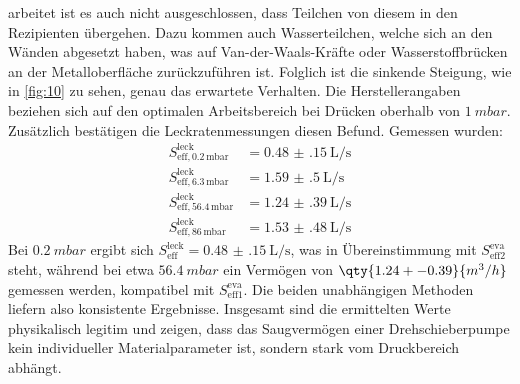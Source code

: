 arbeitet ist es auch nicht ausgeschlossen, dass Teilchen von diesem in den 
Rezipienten übergehen. Dazu kommen auch Wasserteilchen, welche sich an den 
Wänden abgesetzt haben, was auf Van-der-Waals-Kräfte oder Wasserstoffbrücken 
an der Metalloberfläche zurückzuführen ist. Folglich ist die sinkende Steigung, 
wie in \autoref{fig:10} zu sehen, genau das erwartete Verhalten. Die Herstellerangaben
beziehen sich auf den optimalen Arbeitsbereich bei Drücken oberhalb von $\qty{1}{mbar}$.
\vspace{0.5em}
\\
Zusätzlich bestätigen die Leckratenmessungen diesen Befund. Gemessen wurden:
\begin{align*}
    S_{\text{eff}, 0.2\,\text{mbar}}^{\text{leck}}  &= \qty{0.48(15)}{\liter\per\second} \\
    S_{\text{eff}, 6.3\,\text{mbar}}^{\text{leck}}  &= \qty{1.59(50)}{\liter\per\second} \\
    S_{\text{eff}, 56.4\,\text{mbar}}^{\text{leck}} &= \qty{1.24(39)}{\liter\per\second} \\
    S_{\text{eff}, 86\,\text{mbar}}^{\text{leck}}   &= \qty{1.53(48)}{\liter\per\second}
\end{align*}
Bei $\qty{0.2}{mbar}$ ergibt sich $S_\text{eff}^\text{leck} = \qty{0.48(15)}{\liter\per\second}$, was in
Übereinstimmung mit $S_\text{eff2}^\text{eva}$ steht, während bei etwa 
$\qty{56.4}{mbar}$ ein Vermögen von $\qty{1.24+-0.39}{m^3/h}$ gemessen werden, 
kompatibel mit $S_\text{eff1}^\text{eva}$. Die beiden unabhängigen Methoden 
liefern also konsistente Ergebnisse.
\noindent Insgesamt sind die ermittelten Werte physikalisch legitim und zeigen,
dass das Saugvermögen einer Drehschieberpumpe kein individueller Materialparameter
ist, sondern stark vom Druckbereich abhängt.

